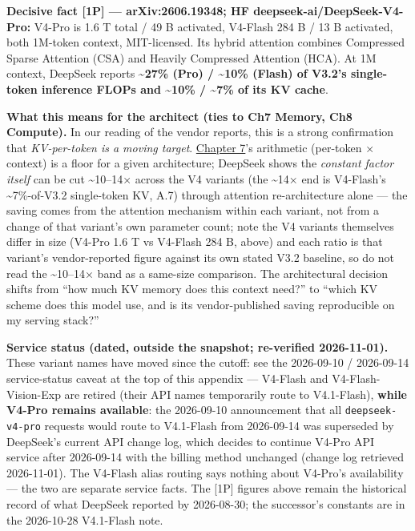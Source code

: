 \textbf{Decisive fact \mbox{{[}1P{]}} --- arXiv:2606.19348; HF
deepseek-ai/DeepSeek-V4-Pro:} V4-Pro is 1.6 T total / 49 B activated,
V4-Flash 284 B / 13 B activated, both 1M-token context, MIT-licensed.
Its hybrid attention combines Compressed Sparse Attention (CSA) and
Heavily Compressed Attention (HCA). At 1M context, DeepSeek reports
\textbf{\textasciitilde27\% (Pro) / \textasciitilde10\% (Flash) of
V3.2's single-token inference FLOPs and \textasciitilde10\% /
\textasciitilde7\% of its KV cache}.

\textbf{What this means for the architect (ties to Ch7 Memory, Ch8
Compute).} In our reading of the vendor reports, this is a strong
confirmation that \emph{KV-per-token is a moving target}. \hyperref[chap:7]{Chapter 7}'s
arithmetic (per-token × context) is a floor for a given architecture;
DeepSeek shows the \emph{constant factor itself} can be cut
\textasciitilde10--14× across the V4 variants (the \textasciitilde14×
end is V4-Flash's \textasciitilde7\%-of-V3.2 single-token KV, A.7)
through attention re-architecture alone --- the saving comes from the
attention mechanism within each variant, not from a change of that
variant's own parameter count; note the V4 variants themselves differ in
size (V4-Pro 1.6 T vs V4-Flash 284 B, above) and each ratio is that
variant's vendor-reported figure against its own stated V3.2 baseline,
so do not read the \textasciitilde10--14× band as a same-size
comparison. The architectural decision shifts from ``how much KV memory
does this context need?'' to ``which KV scheme does this model use, and
is its vendor-published saving reproducible on my serving stack?''

\textbf{Service status (dated, outside the snapshot; re-verified
2026-11-01).} These variant names have moved since the cutoff: see the
2026-09-10 / 2026-09-14 service-status caveat at the top of this
appendix --- V4-Flash and V4-Flash-Vision-Exp are retired (their API
names temporarily route to V4.1-Flash), \textbf{while V4-Pro remains
available}: the 2026-09-10 announcement that all
\texttt{deepseek-v4-pro} requests would route to V4.1-Flash from
2026-09-14 was superseded by DeepSeek's current API change log, which
decides to continue V4-Pro API service after 2026-09-14 with the billing
method unchanged (change log retrieved 2026-11-01). The V4-Flash alias
routing says nothing about V4-Pro's availability --- the two are
separate service facts. The \mbox{{[}1P{]}} figures above remain the historical
record of what DeepSeek reported by 2026-08-30; the successor's
constants are in the 2026-10-28 V4.1-Flash note.

